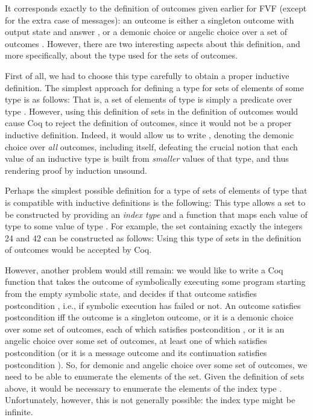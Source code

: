 \documentclass{CSML}
\theoremstyle{definition}\newtheorem{notation}[thm]{Notation}
\theoremstyle{plain}\newtheorem{satz}[thm]{Satz}
\begin{document}
\noindent It corresponds exactly to the definition of outcomes 
given earlier for FVF (except for the extra case of messages): an outcome 
 is either a singleton outcome  with 
output state  and answer , or a demonic choice  or angelic choice  over a set of outcomes . 
However, there are two interesting aspects about this definition, and more 
specifically, about the type  used for the sets of 
outcomes.

First of all, we had to choose this type carefully to obtain a proper 
inductive definition. The simplest approach for defining a type for sets 
of elements of some type  is as follows: 
 That is, a set of elements of type  is simply 
a predicate over type . However, using this definition of sets in the 
definition of outcomes would cause Coq to reject the definition of 
outcomes, since it would not be a proper inductive definition. Indeed, it 
would allow us to write , 
denoting the demonic choice over \emph{all} outcomes, including 
 itself, defeating the 
crucial notion that each value of an inductive type is built from 
\emph{smaller} values of that type, and thus rendering proof by induction 
unsound. 

Perhaps the simplest possible definition for a type of sets of elements of 
type  that is compatible with inductive definitions is the following: 
 This type allows a set to be constructed by providing an 
\emph{index type}  and a function  that maps each value of type  
to some value of type . For example, the set containing exactly the 
integers 24 and 42 can be constructed as follows:
 Using this type of sets in the definition of outcomes would be accepted by Coq.

However, another problem would still remain: we would like to write a Coq 
function that takes the outcome of symbolically executing some program 
starting from the empty symbolic state, and decides if that outcome 
satisfies postcondition , i.e., if symbolic execution has 
failed or not. An outcome satisfies postcondition  iff the 
outcome is a singleton outcome, or it is a demonic choice over some set of 
outcomes, each of which satisfies postcondition , or it is 
an angelic choice over some set of outcomes, at least one of which 
satisfies postcondition  (or it is a message outcome and 
its continuation satisfies postcondition ). So, for demonic 
and angelic choice over some set of outcomes, we need to be able to 
enumerate the elements of the set. Given the definition of sets above, it 
would be necessary to enumerate the elements of the index type . 
Unfortunately, however, this is not generally possible: the index type 
might be infinite.
\end{document}
